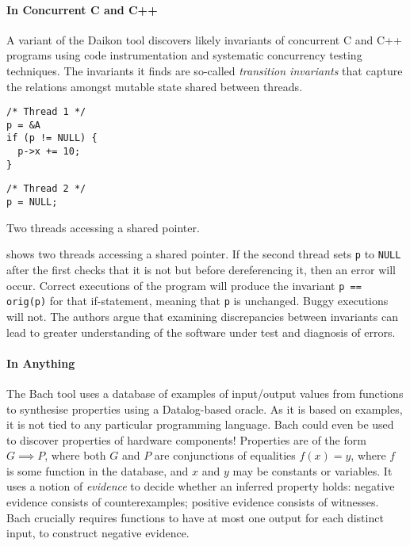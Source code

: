\paragraph{In Concurrent C and C++}
A variant of the Daikon tool discovers likely invariants of concurrent
C and C++ programs using code instrumentation and systematic
concurrency testing techniques\cite{kusano2015}.  The invariants it
finds are so-called \emph{transition invariants} that capture the
relations amongst mutable state shared between threads.

\begin{listing}
\centering
\begin{minipage}[t]{0.3\textwidth}
\begin{verbatim}
/* Thread 1 */
p = &A
if (p != NULL) {
  p->x += 10;
}
\end{verbatim}
\end{minipage}
\begin{minipage}[t]{0.3\textwidth}
\begin{verbatim}
/* Thread 2 */
p = NULL;
\end{verbatim}
\end{minipage}
\caption{Two threads accessing a shared pointer.}\label{lst:cthreads}
\end{listing}

 shows two threads accessing a shared pointer.  If
the second thread sets \verb|p| to \verb|NULL| after the first checks
that it is not but before dereferencing it, then an error will occur.
Correct executions of the program will produce the invariant
\verb|p == orig(p)| for that if-statement, meaning that \verb|p| is
unchanged.  Buggy executions will not.  The authors argue that
examining discrepancies between invariants can lead to greater
understanding of the software under test and diagnosis of errors.

\paragraph{In Anything}
The Bach\cite{smith2017} tool uses a database of examples of
input/output values from functions to synthesise properties using a
Datalog-based oracle.  As it is based on examples, it is not tied to
any particular programming language.  Bach could even be used to
discover properties of hardware components!  Properties are of the
form $G \implies P$, where both $G$ and $P$ are conjunctions of
equalities $f(x) = y$, where $f$ is some function in the database, and
$x$ and $y$ may be constants or variables.  It uses a notion of
\emph{evidence} to decide whether an inferred property holds: negative
evidence consists of counterexamples; positive evidence consists of
witnesses.  Bach crucially requires functions to have at most one
output for each distinct input, to construct negative evidence.
